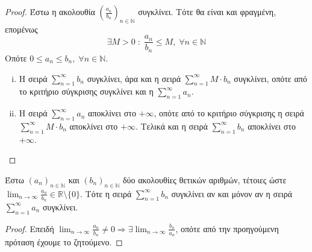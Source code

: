 \documentclass[main.tex]{subfiles}
\begin{document}
\begin{proof}
\item {}
    Έστω η ακολουθία $ {\left(\frac{a_{n}}{b_{n}}\right)}_{n \in \mathbb{N}} $ 
    συγκλίνει.  Τότε θα είναι και φραγμένη, επομένως
    \[
        \exists M>0 \; : \; \frac{a_{n}}{b_{n}} \leq M, \; \forall n \in \mathbb{N} 
    \] 
    Οπότε $ 0 \leq a_{n} \leq b_{n}, \; \forall n \in \mathbb{N} $.
    \begin{enumerate}[i)]
        \item Η σειρά $ \sum_{n=1}^{\infty} b_{n} $ συγκλίνει, άρα και η σειρά 
            $ \sum_{n=1}^{\infty} M\cdot b_{n} $ συγκλίνει, οπότε από το κριτήριο 
            σύγκρισης συγκλίνει και η $ \sum_{n=1}^{\infty} a_{n} $.
        \item Η σειρά $ \sum_{n=1}^{\infty} a_{n} $ αποκλίνει στο $ + \infty $, 
            οπότε από το κριτήριο σύγκρισης η σειρά 
            $ \sum_{n=1}^{\infty} M \cdot b_{n} $ αποκλίνει
            στο $ + \infty $. Τελικά και η σειρά $ \sum_{n=1}^{\infty} b_{n} $ 
            αποκλίνει στο $ + \infty $.
    \end{enumerate}
\end{proof}

\begin{cor}
    Έστω $ {(a_{n})}_{n \in \mathbb{N}} $ και $ {(b_{n})}_{n \in \mathbb{N}} $ δύο 
    ακολουθίες θετικών αριθμών, τέτοιες ώστε $ \lim_{n \to \infty} \frac{a_{n}}{b_{n}} 
    \in \mathbb{R} \setminus \{ 0 \}$. Τότε η σειρά $ \sum_{n=1}^{\infty} b_{n} $ 
    συγκλίνει αν και μόνον αν η σειρά $ \sum_{n=1}^{\infty} a_{n} $ συγκλίνει.
\end{cor}
\begin{proof}
    Επειδή $ \lim_{n \to \infty} \frac{a_{n}}{b_{n}} \neq 0 \Rightarrow \exists 
    \lim_{n \to \infty} \frac{b_{n}}{a_{n}}$, οπότε από την προηγούμενη πρόταση 
    έχουμε το ζητούμενο.
\end{proof}
\end{document}
